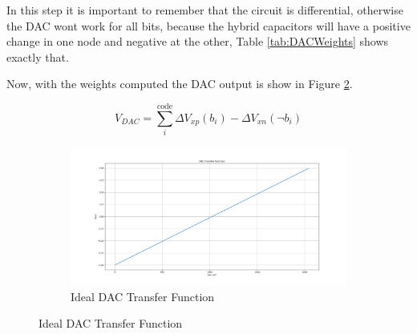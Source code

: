 In this step it is important to remember that the circuit is differential, otherwise the DAC wont work for all bits, because the hybrid capacitors will have a positive change in one node and negative at the other, Table \ref{tab:DACWeights} shows exactly that. 

Now, with the weights computed the DAC output is show in Figure \ref{fig:DAC_TF}.

\begin{equation}
    V_{DAC} = \sum_{i}^{\text{code}}\Delta V_{xp}(b_i)- \Delta V_{xn}(\neg b_i)
    \label{eq:VDAC}
\end{equation}

\begin{figure}[h]
    \centering

    \begin{subfigure}[b]{0.9\textwidth}
        \centering
        \includegraphics[width=\textwidth]{Images/DAC_TransFunc_ideal.png}
        \caption{Ideal DAC Transfer Function}
        \label{fig:DAC_TF}
    \end{subfigure}%


\end{figure}
